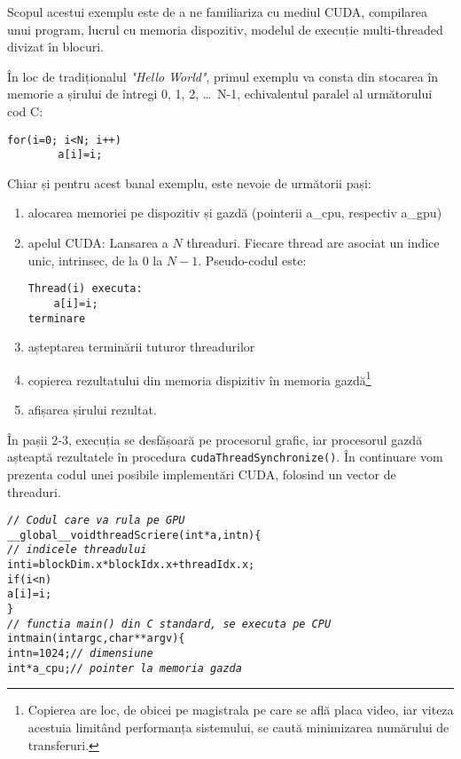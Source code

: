 \documentclass[9pt,a4paper]{article}
\begin{document}
Scopul acestui exemplu este de a ne familiariza cu mediul CUDA, compilarea unui program, lucrul cu memoria dispozitiv, modelul de execuție multi-threaded divizat în blocuri.

În loc de tradiționalul \textit{"Hello World"}, primul exemplu va consta din stocarea în memorie a șirului de întregi 0, 1, 2, \dots\  N-1, echivalentul paralel al următorului cod C:
\begin{Verbatim}[xleftmargin=.5in]
for(i=0; i<N; i++)
        a[i]=i;
\end{Verbatim}
Chiar și pentru acest banal exemplu, este nevoie de următorii pași:
\begin{enumerate}
    \item alocarea memoriei pe dispozitiv și gazdă (pointerii a\_cpu, respectiv a\_gpu)
    \item apelul CUDA: Lansarea a $N$ threaduri. Fiecare thread are asociat un indice unic, intrinsec, de la $0$ la $N-1$. Pseudo-codul este:
\begin{Verbatim}
Thread(i) executa:
    a[i]=i;
terminare
\end{Verbatim}
\item așteptarea terminării tuturor threadurilor
\item copierea rezultatului din memoria dispizitiv în memoria gazdă\footnote{Copierea are loc, de obicei pe magistrala pe care se află placa video, iar viteza acestuia limitând performanța sistemului, se caută minimizarea numărului de transferuri.}
\item afișarea șirului rezultat.
\end{enumerate}
În pașii 2-3, execuția se desfășoară pe procesorul grafic, iar procesorul gazdă așteaptă rezultatele în procedura \texttt{cudaThreadSynchronize()}. În continuare vom prezenta codul unei posibile implementări CUDA, folosind un vector de threaduri.
\begin{alltt}
{\it \texttt{// Codul care va rula pe GPU}}
__global__ void threadScriere(int * a, int n) {\{}
        {\it \texttt{// indicele threadului}}
        int i = blockDim.x * blockIdx.x + threadIdx.x;
        if (i < n)
                a[i] = i;
{\}}
{\it \texttt{// functia main() din C standard, se executa pe CPU}}
int main(int argc, char ** argv) {\{}
    int n = 1024; {\it \texttt{// dimensiune}}
    int *a_cpu;   {\it \texttt{// pointer la memoria gazda}}
\end{alltt}
\end{document}
